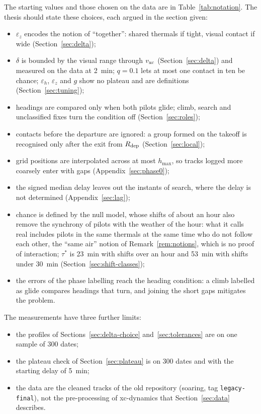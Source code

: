 The starting values and those chosen on the data are in Table~\ref{tab:notation}. The thesis
should state these choices, each argued in the section given:
\begin{itemize}
  \item $\varepsilon_z$ encodes the notion of ``together'': shared thermals if tight, visual
        contact if wide (Section~\ref{sec:delta});
  \item $\delta$ is bounded by the visual range through $v_{\mathrm{xc}}$ (Section~\ref{sec:delta}) and
        measured on the data at 2~min; $q=0.1$ lets at most one contact in ten be chance;
        $\varepsilon_h$, $\varepsilon_z$ and $g$ show no plateau and are definitions
        (Section~\ref{sec:tuning});
  \item headings are compared only when both pilots glide; climb, search and unclassified fixes
        turn the condition off (Section~\ref{sec:roles}); 
  \item contacts before the departure are ignored: a group formed on the takeoff is recognised
        only after the exit from $R_{\mathrm{dep}}$ (Section~\ref{sec:local});
  \item grid positions are interpolated across at most $h_{\max}$, so tracks logged more coarsely
        enter with gaps (Appendix~\ref{sec:phase0});
  \item the signed median delay leaves out the instants of search, where the delay is not
        determined (Appendix~\ref{sec:lag});
  \item chance is defined by the null model, whose shifts of about an hour also remove the
        synchrony of pilots with the weather of the hour: what it calls real includes pilots in the
        same thermals at the same time who do not follow each other, the ``same air'' notion of
        Remark~\ref{rem:notions}, which is no proof of interaction; $\tau^*$ is 23~min with shifts
        over an hour and 53~min with shifts under 30~min (Section~\ref{sec:shift-classes});
  \item the errors of the phase labelling reach the heading condition: a climb labelled as glide
        compares headings that turn, and joining the short gaps mitigates the problem.
\end{itemize}
The measurements have three further limits:
\begin{itemize}
  \item the profiles of Sections~\ref{sec:delta-choice} and~\ref{sec:tolerances} are on one sample
        of 300 dates;
  \item the plateau check of Section~\ref{sec:plateau} is on 300 dates and with the starting delay
        of 5~min;
  \item the data are the cleaned tracks of the old repository (soaring, tag
        \texttt{legacy-final}), not the pre-processing of xc-dynamics that
        Section~\ref{sec:data} describes.
\end{itemize}

